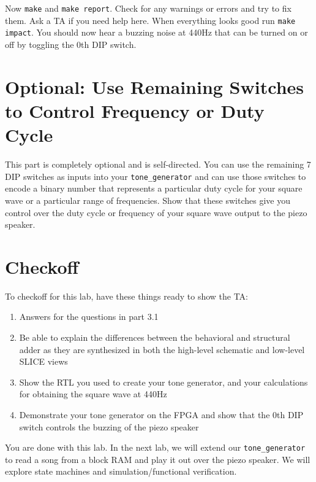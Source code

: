 \documentclass[11pt]{article}
\begin{document}
Now \verb|make| and \verb|make report|. Check for any warnings or errors and try to fix them. Ask a TA if you need help here. When everything looks good run \verb|make impact|. You should now hear a buzzing noise at 440Hz that can be turned on or off by toggling the 0th DIP switch.


\section{Optional: Use Remaining Switches to Control Frequency or Duty Cycle}
This part is completely optional and is self-directed. You can use the remaining 7 DIP switches as inputs into your \verb|tone_generator| and can use those switches to encode a binary number that represents a particular duty cycle for your square wave or a particular range of frequencies. Show that these switches give you control over the duty cycle or frequency of your square wave output to the piezo speaker.

\section{Checkoff}
To checkoff for this lab, have these things ready to show the TA:

\begin{enumerate}
	\item Answers for the questions in part 3.1
	\item Be able to explain the differences between the behavioral and structural adder as they are synthesized in both the high-level schematic and low-level SLICE views
	\item Show the RTL you used to create your tone generator, and your calculations for obtaining the square wave at 440Hz
	\item Demonstrate your tone generator on the FPGA and show that the 0th DIP switch controls the buzzing of the piezo speaker
\end{enumerate}

You are done with this lab. In the next lab, we will extend our \verb|tone_generator| to read a song from a block RAM and play it out over the piezo speaker. We will explore state machines and simulation/functional verification.

\end{document}
